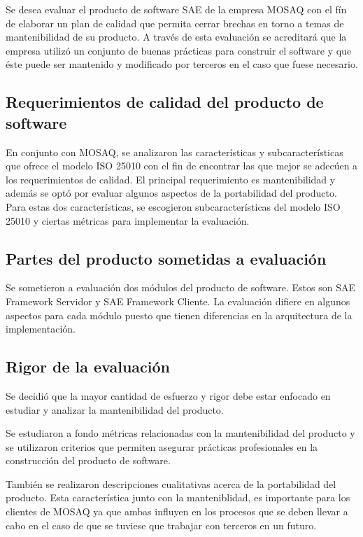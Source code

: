 Se desea evaluar el producto de software SAE de la empresa MOSAQ con el fín de
elaborar un plan de calidad que permita cerrar brechas en torno a temas de 
mantenibilidad de su producto. A través de esta evaluación se acreditará que la 
empresa utilizó un conjunto de buenas prácticas para construir el software y que 
éste puede ser mantenido y modificado por terceros en el caso que fuese necesario.

\subsection{Requerimientos de calidad del producto de software}

En conjunto con MOSAQ, se analizaron las características y subcaracterísticas que ofrece
el modelo ISO 25010 con el fin de encontrar las que mejor se adecúen a los requerimientos
de calidad. El principal requerimiento es mantenibilidad y además se optó por evaluar
algunos aspectos de la portabilidad del producto. Para estas dos características, se
escogieron subcaracterísticas del modelo ISO 25010 y ciertas métricas para implementar
la evaluación.

\subsection{Partes del producto sometidas a evaluación}

Se sometieron a evaluación dos módulos del producto de software. Estos son SAE Framework
Servidor y SAE Framework Cliente. La evaluación difiere en algunos aspectos para cada módulo
puesto que tienen diferencias en la arquitectura de la implementación.

\subsection{Rigor de la evaluación}

Se decidió que la mayor cantidad de esfuerzo y rigor debe estar enfocado en estudiar y
analizar la mantenibilidad del producto. 

Se estudiaron a fondo métricas relacionadas con la mantenibilidad del producto y se
utilizaron criterios que permiten asegurar prácticas profesionales en la construcción
del producto de software.

También se realizaron descripciones cualitativas acerca de la portabilidad del producto.
Esta característica junto con la manteniblidad, es importante para los clientes de MOSAQ
ya que ambas influyen en los procesos que se deben llevar a cabo en el caso de que se tuviese
que trabajar con terceros en un futuro.

